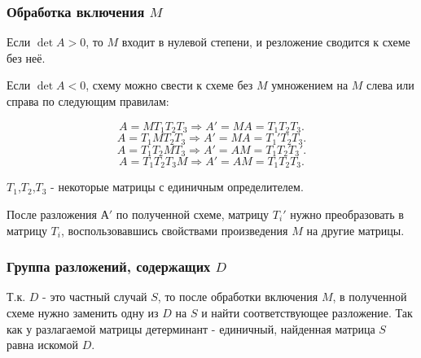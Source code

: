 \subsubsection{Обработка включения $M$}

Если $\det A > 0$, то $M$ входит в нулевой степени, и резложение сводится к схеме без неё.

Если $\det A < 0$, схему можно свести к схеме без $M$ умножением на $M$ слева или справа по следующим правилам:

$$A = MT_1T_2T_3 \Rightarrow A' = MA = T_1T_2T_3.$$
$$A = T_1MT_2T_3 \Rightarrow A' = MA = T_1'T_2T_3.$$
$$A = T_1T_2MT_3 \Rightarrow A' = AM = T_1T_2T_3'.$$
$$A = T_1T_2T_3M \Rightarrow A' = AM = T_1T_2T_3.$$

$T_1$,$T_2$,$T_3$ - некоторые матрицы с единичным определителем.

После разложения $А'$ по полученной схеме, матрицу $T_i'$ нужно преобразовать в матрицу $T_i$, воспользовавшись свойствами произведения $M$ на другие матрицы.

\subsubsection{Группа разложений, содержащих $D$}

Т.к. $D$ - это частный случай $S$, то после обработки включения $M$, в полученной схеме нужно заменить одну из $D$ на $S$ и найти соответствующее разложение. Так как у разлагаемой матрицы детерминант - единичный, найденная матрица $S$ равна искомой $D$.

